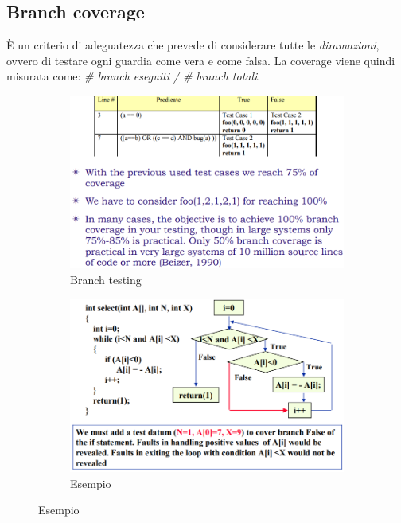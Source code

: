 \documentclass[a4paper,oneside,titlepage]{book}
\begin{document}
\subsection{Branch coverage}
\`{E} un criterio di adeguatezza che prevede di considerare tutte le \textit{diramazioni}, ovvero di testare ogni guardia come vera e come falsa. La coverage viene quindi misurata come: \textit{\# branch eseguiti / \# branch totali}.
\begin{figure}[htp]
	\begin{subfigure}{0.49\textwidth}
	    \centering
		\includegraphics[width=\textwidth, height=\textheight, keepaspectratio]{branch1.png}
		\caption{Branch testing}
	\end{subfigure}
	\hfill
	\begin{subfigure}{0.49\textwidth}
	    \centering
		\includegraphics[width=\textwidth, height=\textheight, keepaspectratio]{branch2.png}
		\caption{Esempio}
	\end{subfigure}
\end{figure}
\end{document}
